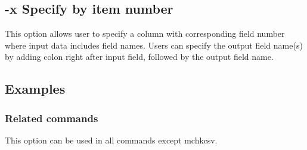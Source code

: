 %

\subsection{-x Specify by item number\label{sect:option_x}}

This option allows user to specify a column with corresponding field number where input data includes field names. Users can specify the output field name(s) by adding colon right after input field, followed by the output field name. 

\subsection*{Examples}


\subsubsection*{Related commands}
This option can be used in all commands except mchkcsv.

%

